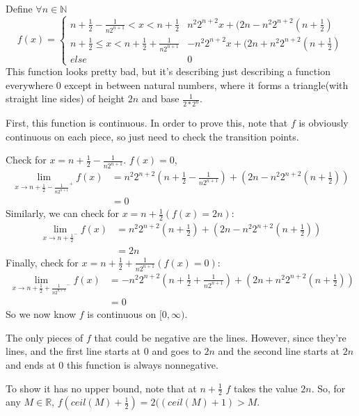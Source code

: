\documentclass{article}
\begin{document}
Define $\forall n \in \mathbb{N}$ \[ f(x) = \begin{cases}
n+\frac{1}{2} - \frac{1}{n2^{n+1}} < x < n + \frac{1}{2} & n^{2}2^{n+2}x + (2n - n^{2}2^{n+2}(n+\frac{1}{2})\\
n+\frac{1}{2} \leq x < n+\frac{1}{2} + \frac{1}{n2^{n+1}} & -n^{2}2^{n+2}x + (2n + n^{2}2^{n+2}(n+\frac{1}{2})\\
else &0
\end{cases} 
\]
This function looks pretty bad, but it's describing just describing a function everywhere 0 except in between natural numbers, where it forms a triangle(with straight line sides) of height $2n$ and base $\frac{1}{2*2^{n}}$.

First, this function is continuous. In order to prove this, note that $f$ is obviously continuous on each piece, so just need to check the transition points.

Check for $x = n+\frac{1}{2} - \frac{1}{n2^{n+1}}$. $f(x) = 0$, 
\begin{align*}
\lim_{x \rightarrow {n+\frac{1}{2} - \frac{1}{n2^{n+1}}}^{+}} f(x) &= n^{2}2^{n+2}(n+\frac{1}{2} - \frac{1}{n2^{n+1}}) + (2n - n^{2}2^{n+2}(n+\frac{1}{2}))\\
&=0
\end{align*}
Similarly, we can check for $x = n + \frac{1}{2} (f(x) = 2n)$:
\begin{align*}
\lim_{x \rightarrow {n + \frac{1}{2}}^{-}} f(x) &=  n^{2}2^{n+2}( n + \frac{1}{2}) + (2n - n^{2}2^{n+2}(n+\frac{1}{2}))\\
&= 2n
\end{align*}
Finally, check for $x =n+\frac{1}{2} + \frac{1}{n2^{n+1}} (f(x) = 0)$:
\begin{align*}
\lim_{x \rightarrow {n+\frac{1}{2} + \frac{1}{n2^{n+1}}}^{-}} f(x) &= -n^{2}2^{n+2}(n+\frac{1}{2} + \frac{1}{n2^{n+1}}) + (2n + n^{2}2^{n+2}(n+\frac{1}{2}))\\
&=0
\end{align*}
So we now know $f$ is continuous on $[0, \infty)$. 

The only pieces of $f$ that could be negative are the lines. However, since they're lines, and the first line starts at 0 and goes to $2n$ and the second line starts at $2n$ and ends at 0 this function is always nonnegative.

To show it has no upper bound, note that at $n+\frac{1}{2}$ $f$ takes the value $2n$. So, for any $M \in \mathbb{R}$, $f(ceil(M) + \frac{1}{2}) = 2((ceil(M)+1) > M$.
\end{document}
